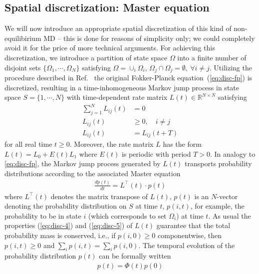 \documentclass[aps, pre, preprint,unsortedaddress,a4paper,onecolumn]{revtex4}
\newcommand{\vect}[1]{#1}
\newcommand{\myphi}{\Phi}
\begin{document}
\subsection{Spatial discretization: Master equation}
We will now introduce an appropriate spatial discretization of this kind of non-equilibirium MD -- this is done for reasons of simplicity only; we could completely avoid it for the price of more technical arguments.
For achieving this discretization, we 
introduce a partition of state space $\Omega$ into a finite number of disjoint
sets $\{ \Omega_1, \cdots, \Omega_N\}$ satisfying $\Omega = \cup_i \Omega_i$,
$\Omega_j\cap \Omega_j = \emptyset,\ \forall i\neq j$.
Utilizing the procedure described in Ref.~\cite{latorre2011structure} the original Fokker-Planck equation~(\ref{eq:disc-fp})
is discretized, resulting in a time-inhomogeneous Markov jump process in state
space $S = \{1, \cdots, N\}$ with time-dependent rate
matrix $\vect L(t) \in \mathbb R^{N\times N}$ satisfying
\begin{align}\label{eq:disc-4}
\sum\limits_{j=1}^N L_{ij}(t) & =  0\\ \label{eq:disc-5}
L_{ij}(t) & \ge  0, \quad i\not= j\\
L_{ij}(t) & =  L_{ij}(t+T)
\end{align}
for all real time $t\geq 0$.
Moreover, the rate matrix $L$ has the form $\vect L(t)=\vect L_0+E(t)\vect L_1$
where $E(t)$ is periodic with period $T>0$.
In analogy to \eqref{eq:disc-fp}, the Markov jump process generated by
$\vect L(t)$ transports probability distributions according to the associated Master equation
\begin{align}
  \label{eq:disc-master}
  \frac{d\vect p(t)}{dt} = \vect L^{\top}(t)\cdot \vect p(t)
\end{align}
where $\vect L^{\top}(t)$ denotes the matrix transpose of $\vect L(t)$, $\vect p(t)$ is an $N$-vector denoting the probability distribution on $S$ at time $t$, $p(i,t)$, for example, the probability to be in state $i$ (which corresponds to set $\Omega_i$) at time $t$.
As usual the properties (\ref{eq:disc-4}) and (\ref{eq:disc-5}) of
$\vect L(t)$ guarantee that the total probability mass is conserved,
i.e., if $p(i,0)\ge 0$ componentwise, then $p(i,t)\ge 0$ and $\sum_i
p(i,t) = \sum_ip(i,0)$.
The temporal evolution of the probability distribution $\vect p(t)$ can be formally written
\begin{align}  \label{eq:disc-8}
\vect p(t)=\myphi(t)\vect p(0)
\end{align}
\end{document}
